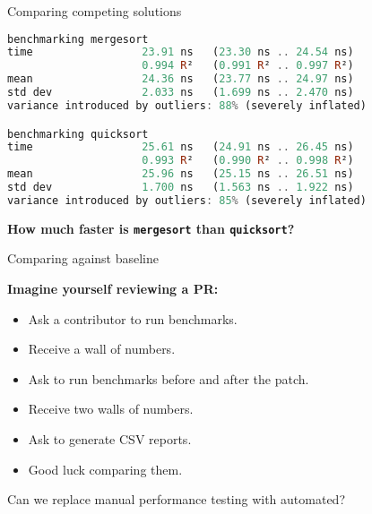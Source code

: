 \documentclass[handout]{beamer}
\begin{document}
\begin{frame}[fragile]{Comparing competing solutions}

\begin{lstlisting}[language=Haskell]
benchmarking mergesort
time                 23.91 ns   (23.30 ns .. 24.54 ns)
                     0.994 R²   (0.991 R² .. 0.997 R²)
mean                 24.36 ns   (23.77 ns .. 24.97 ns)
std dev              2.033 ns   (1.699 ns .. 2.470 ns)
variance introduced by outliers: 88% (severely inflated)

benchmarking quicksort
time                 25.61 ns   (24.91 ns .. 26.45 ns)
                     0.993 R²   (0.990 R² .. 0.998 R²)
mean                 25.96 ns   (25.15 ns .. 26.51 ns)
std dev              1.700 ns   (1.563 ns .. 1.922 ns)
variance introduced by outliers: 85% (severely inflated)
\end{lstlisting}

\pause


\centerline{\bf How much faster is {\tt mergesort} than {\tt quicksort}?}

\end{frame}

\begin{frame}[fragile]{Comparing against baseline}

\centerline{\bf Imagine yourself reviewing a PR:}

\begin{itemize}[<+->]
\item Ask a contributor to run benchmarks.
\item Receive a wall of numbers.
\item Ask to run benchmarks before and after the patch.
\item Receive two walls of numbers.
\item Ask to generate CSV reports.
\item Good luck comparing them.
\end{itemize}

\pause

\bigskip

Can we replace manual performance testing with automated?

\end{frame}
\end{document}
